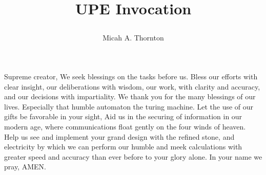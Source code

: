 \documentclass{article}
\title{UPE Invocation\author{Micah A. Thornton}}
\begin{document}
\begin{center}
\maketitle{}
Supreme creator, 
We seek blessings on the tasks before us.
Bless our efforts with clear  insight,
our deliberations with wisdom,
our work, with clarity and accuracy,
and our decisions with impartiality. 
We thank you for the many blessings of our lives.
Especially that humble automaton the turing machine. 
Let the use of our gifts be favorable in your sight, 
Aid us in the securing of 
information in our modern age, where communications float gently on the four winds of heaven. 
Help us see and implement your grand design with the refined stone, and electricity by which we can perform our humble and meek calculations with greater speed and accuracy than ever before to your glory alone. 
In your name we pray, 
AMEN.
\end{center}
\end{document}
